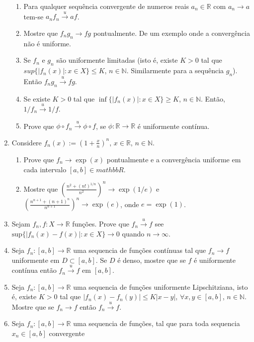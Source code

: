 \documentclass{article}
\theoremstyle{plain}
\theoremstyle{definition}
\theoremstyle{remark}
\begin{document}
\begin{enumerate}
\begin{enumerate}
     \item Para qualquer sequência convergente de numeros reais 
     $a_{n} \in \mathbb{R}$ com $a_{n} \rightarrow a$ tem-se 
     $a_{n}f_{n} \xrightarrow{u} af$.
     \item Mostre que $f_{n}g_{n}\rightarrow fg$ pontualmente. De um exemplo onde a convergência não é uniforme. 
     \item Se $f_{n}$ e $g_n$ são uniformente limitadas (isto é, 
     existe $K>0$ tal que  
     $sup\{|f_{n}(x)|: x \in X\}\leq K$, $n \in \mathbb{N}$. Similarmente para a sequência $g_{n}$). 
     Então  $f_{n}g_{n}\xrightarrow{u} fg$.
     \item Se existe $K>0$ tal que $\inf \{|f_{n}(x)|: x \in X\}\geq K$, $n \in \mathbb{N}$. Então, $1/f_{n}\xrightarrow{u} 1/f$.
     \item Prove que $\phi \circ f_{n} \xrightarrow{u} \phi \circ f$, se 
     $\phi: \mathbb{R}\rightarrow \mathbb{R}$ é uniformente contínua.
     \end{enumerate}
  \item Considere $f_{n}(x):=(1+\frac{x}{n})^{n}$, 
  $x \in \mathbb{R}$, $n \in \mathbb{N}$. 
   \begin{enumerate}
   \item Prove que $f_{n}\rightarrow \exp(x)$ pontualmente e a convergência uniforme em cada intervalo $[a,b] \in mathbb{R}$.
   \item Mostre que 
   $(\frac{n^2+(n!)^{1/n}}{n^{2}})^{n} \rightarrow \exp(1/e)$ e
   $(\frac{n^{n+1}+(n+1)^{n}}{n^{n+1}})^{n} \rightarrow \exp(e)$, 
   onde $e=\exp(1)$.
   \end{enumerate}      
  \item Sejam $f_{n}, f:X \rightarrow \mathbb{R}$ funções. 
  Prove que $f_{n}\xrightarrow{u} f$ see 
  $\text{sup}\{|f_{n}(x)-f(x)|:x \in X\} \rightarrow 0$ quando 
  $n \rightarrow \infty$.
  \item Seja $f_{n}:[a,b] \rightarrow \mathbb{R}$ uma sequencia de funções 
  contínuas tal que $f_{n}\rightarrow f$ uniformente em $D\subset [a,b]$.
  Se $D$ é denso, mostre que se $f$ é uniformente contínua então 
  $f_{n}\xrightarrow{u} f$ em $[a,b]$.
  \item Seja $f_{n}:[a,b] \rightarrow \mathbb{R}$ uma sequencia de funções
  uniformente Lipschitziana, isto é, existe $K>0$ tal que  
  $|f_{n}(x)-f_{n}(y)|\leq K|x-y|$, $\forall x,y \in [a,b]$, 
  $n \in \mathbb{N}$. Mostre que se $f_{n}\rightarrow f$ então 
  $f_{n}\xrightarrow{u} f$.
  \item Seja $f_{n}:[a,b] \rightarrow \mathbb{R}$ uma sequencia de funções, tal que para toda sequencia $x_{n}\in [a,b]$ convergente

\end{enumerate}
\end{document}
